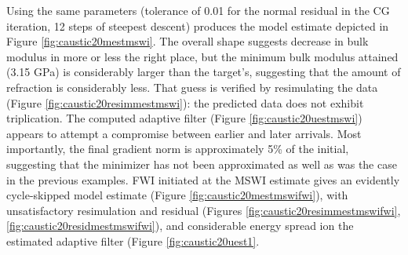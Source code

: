 Using the same parameters (tolerance of 0.01 for the normal residual
in the CG iteration, 12 steps of steepest descent) produces the model
estimate depicted in Figure \ref{fig:caustic20mestmswi}. The overall
shape suggests decrease in bulk modulus in more or less the right
place, but the minimum bulk modulus attained (3.15 GPa) is considerably larger
than the target's, suggesting that the amount of refraction is
considerably less. That guess is verified by resimulating the data
(Figure \ref{fig:caustic20resimmestmswi}): the predicted data does not
exhibit triplication. The computed adaptive filter (Figure 
\ref{fig:caustic20uestmswi}) appears to attempt a compromise between
earlier and later arrivals. Most importantly, the final gradient norm
is approximately 5\% of the initial, suggesting that the minimizer has
not been approximated as well as was the case in the previous
examples. FWI initiated at the MSWI estimate gives an evidently
cycle-skipped model estimate (Figure \ref{fig:caustic20mestmswifwi}),
with unsatisfactory resimulation and residual (Figures
\ref{fig:caustic20resimmestmswifwi},
\ref{fig:caustic20residmestmswifwi}), and considerable energy spread
ion the estimated adaptive filter (Figure \ref{fig:caustic20uest1}.








